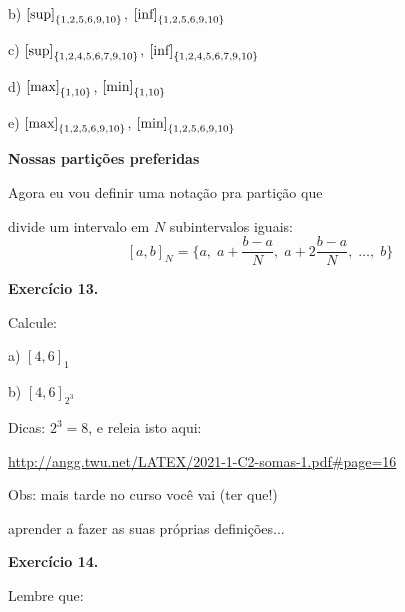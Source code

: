 \documentclass[oneside,12pt]{article}
\begin{document}
\ssk

b) $\text{[sup]}_{\{1,2,5,6,9,10\}}$, 
   $\text{[inf]}_{\{1,2,5,6,9,10\}}$

\ssk

c) $\text{[sup]}_{\{1,2,4,5,6,7,9,10\}}$, 
   $\text{[inf]}_{\{1,2,4,5,6,7,9,10\}}$

\bsk

d) $\text{[max]}_{\{1,10\}}$, 
   $\text{[min]}_{\{1,10\}}$

\ssk

e) $\text{[max]}_{\{1,2,5,6,9,10\}}$, 
   $\text{[min]}_{\{1,2,5,6,9,10\}}$



\newpage


{\bf Nossas partições preferidas}

Agora eu vou definir uma notação pra partição que

divide um intervalo em $N$ subintervalos iguais:
%
\def\baN{\frac{b-a}{N}}
%
$$
  \textstyle
  [a,b]_N = \{a, \; a+\baN, \; a+2\baN, \; \ldots, \; b\}
$$

\msk

{\bf Exercício 13.}

Calcule:

a) $[4,6]_1$

b) $[4,6]_{2^3}$

\msk

Dicas: $2^3=8$, e releia isto aqui:

\ssk

{\footnotesize

\url{http://angg.twu.net/LATEX/2021-1-C2-somas-1.pdf\#page=16}

}

\bsk


Obs: mais tarde no curso você vai (ter que!)

aprender a fazer as suas próprias definições...

\newpage


{\bf Exercício 14.}

Lembre que:
\end{document}

